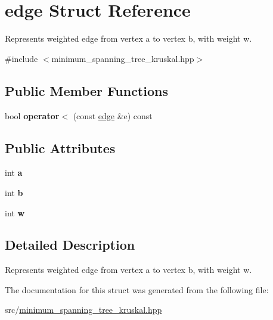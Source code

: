 \hypertarget{structedge}{\section{edge Struct Reference}
\label{structedge}
}


Represents weighted edge from vertex a to vertex b, with weight w.  




{\ttfamily \#include $<$minimum\-\_\-spanning\-\_\-tree\-\_\-kruskal.\-hpp$>$}

\subsection*{Public Member Functions}
\begin{DoxyCompactItemize}
\item 
\hypertarget{structedge_a1be1d1dcbe96713a4dabdc83b9253b6d}{bool {\bfseries operator$<$} (const \hyperlink{structedge}{edge} \&e) const }\label{structedge_a1be1d1dcbe96713a4dabdc83b9253b6d}

\end{DoxyCompactItemize}
\subsection*{Public Attributes}
\begin{DoxyCompactItemize}
\item 
\hypertarget{structedge_a4094684ed54ca0e4ec3a9b251bfb2b0f}{int {\bfseries a}}\label{structedge_a4094684ed54ca0e4ec3a9b251bfb2b0f}

\item 
\hypertarget{structedge_ae76a37f47c8fca97b8adfcb588130e0d}{int {\bfseries b}}\label{structedge_ae76a37f47c8fca97b8adfcb588130e0d}

\item 
\hypertarget{structedge_a2b4c1e3301482cde167eeb25135fa4ea}{int {\bfseries w}}\label{structedge_a2b4c1e3301482cde167eeb25135fa4ea}

\end{DoxyCompactItemize}


\subsection{Detailed Description}
Represents weighted edge from vertex a to vertex b, with weight w. 

The documentation for this struct was generated from the following file\-:\begin{DoxyCompactItemize}
\item 
src/\hyperlink{minimum__spanning__tree__kruskal_8hpp}{minimum\-\_\-spanning\-\_\-tree\-\_\-kruskal.\-hpp}\end{DoxyCompactItemize}
